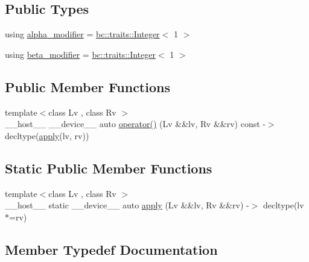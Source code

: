 \subsection*{Public Types}
\begin{DoxyCompactItemize}
\item 
using \hyperlink{structbc_1_1oper_1_1Mul__Assign_abf4ebe5753ac6898767c813ef20e213b}{alpha\+\_\+modifier} = \hyperlink{structbc_1_1traits_1_1Integer}{bc\+::traits\+::\+Integer}$<$ 1 $>$
\item 
using \hyperlink{structbc_1_1oper_1_1Mul__Assign_a329696cc706b6b989d80866e2369c8e1}{beta\+\_\+modifier} = \hyperlink{structbc_1_1traits_1_1Integer}{bc\+::traits\+::\+Integer}$<$ 1 $>$
\end{DoxyCompactItemize}
\subsection*{Public Member Functions}
\begin{DoxyCompactItemize}
\item 
{\footnotesize template$<$class Lv , class Rv $>$ }\\\+\_\+\+\_\+host\+\_\+\+\_\+ \+\_\+\+\_\+device\+\_\+\+\_\+ auto \hyperlink{structbc_1_1oper_1_1Mul__Assign_adf0fbc4cbdf93e42b696ab755c3f020d}{operator()} (Lv \&\&lv, Rv \&\&rv) const -\/$>$ decltype(\hyperlink{structbc_1_1oper_1_1Mul__Assign_a978e562d5cf0e2edc19854a626e1d40e}{apply}(lv, rv))
\end{DoxyCompactItemize}
\subsection*{Static Public Member Functions}
\begin{DoxyCompactItemize}
\item 
{\footnotesize template$<$class Lv , class Rv $>$ }\\\+\_\+\+\_\+host\+\_\+\+\_\+ static \+\_\+\+\_\+device\+\_\+\+\_\+ auto \hyperlink{structbc_1_1oper_1_1Mul__Assign_a978e562d5cf0e2edc19854a626e1d40e}{apply} (Lv \&\&lv, Rv \&\&rv) -\/$>$ decltype(lv $\ast$=rv)
\end{DoxyCompactItemize}


\subsection{Member Typedef Documentation}
\mbox{\label{structbc_1_1oper_1_1Mul__Assign_abf4ebe5753ac6898767c813ef20e213b}} 
